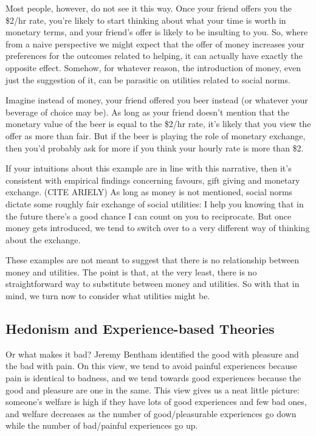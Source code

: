 \documentclass[]{tufte-book}
\begin{document}
Most people, however, do not see it this way. Once your friend offers you the \$2/hr rate, you're likely to start thinking about what your time is worth in monetary terms, and your friend's offer is likely to be insulting to you. So, where from a naive perspective we might expect that the offer of money increases your preferences for the outcomes related to helping, it can actually have exactly the opposite effect. Somehow, for whatever reason, the introduction of money, even just the suggestion of it, can be parasitic on utilities related to social norms.

 Imagine instead of money, your friend offered you beer instead (or whatever your beverage of choice may be). As long as your friend doesn't mention that the monetary value of the beer is equal to the \$2/hr rate, it's likely that you view the offer as more than fair. But if the beer is playing the role of monetary exchange, then you'd probably ask for more if you think your hourly rate is more than \$2.

If your intuitions about this example are in line with this narrative, then it's consistent with empirical findings concerning favours, gift giving and monetary exchange. (CITE ARIELY) As long as money is not mentioned, social norms dictate some roughly fair exchange of social utilities: I help you knowing that in the future there's a good chance I can count on you to reciprocate. But once money gets introduced, we tend to switch over to a very different way of thinking about the exchange.

These examples are not meant to suggest that there is no relationship between money and utilities. The point is that, at the very least, there is no straightforward way to substitute between money and utilities. So with that in mind, we turn now to consider what utilities might be.

\hypertarget{hedonism-and-experience-based-theories}{%
\subsection{Hedonism and Experience-based Theories}\label{hedonism-and-experience-based-theories}}

 Or what makes it bad? Jeremy Bentham identified the good with pleasure and the bad with pain. On this view, we tend to avoid painful experiences because pain is identical to badness, and we tend towards good experiences because the good and pleasure are one in the same. This view gives us a neat little picture: someone's welfare is high if they have lots of good experiences and few bad ones, and welfare decreases as the number of good/pleasurable experiences go down while the number of bad/painful experiences go up.
\end{document}
